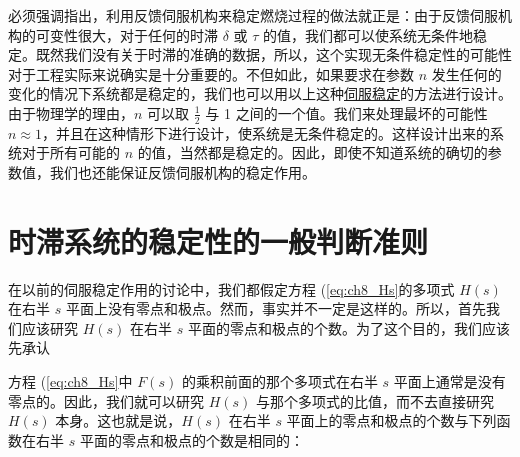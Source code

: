 必须强调指出，利用反馈伺服机构来稳定燃烧过程的做法就正是：由于反馈伺服机构的可变性很大，对于任何的时滞 $ \delta $ 或 $ \tau $ 的值，我们都可以使系统无条件地稳定。既然我们没有关于时滞的准确的数据，所以，这个实现无条件稳定性的可能性对于工程实际来说确实是十分重要的。不但如此，如果要求在参数 $ n $ 发生任何的变化的情况下系统都是稳定的，我们也可以用以上这种\underline{伺服稳定}的方法进行设计。由于物理学的理由，$ n $ 可以取 $ \frac{1}{2} $ 与 1 之间的一个值。我们来处理最坏的可能性 $ n \approx 1 $，并且在这种情形下进行设计，使系统是无条件稳定的。这样设计出来的系统对于所有可能的 $ n $ 的值，当然都是稳定的。因此，即使不知道系统的确切的参数值，我们也还能保证反馈伺服机构的稳定作用。

\section{时滞系统的稳定性的一般判断准则}

在以前的伺服稳定作用的讨论中，我们都假定方程 (\eqref{eq:ch8_Hs}的多项式 $ H(s) $ 在右半 $ s $ 平面上没有零点和极点。然而，事实并不一定是这样的。所以，首先我们应该研究 $ H(s) $ 在右半 $ s $ 平面的零点和极点的个数。为了这个目的，我们应该先承认

方程 (\eqref{eq:ch8_Hs}中 $ F(s) $ 的乘积前面的那个多项式在右半 $ s $ 平面上通常是没有零点的。因此，我们就可以研究 $ H(s) $ 与那个多项式的比值，而不去直接研究 $ H(s) $ 本身。这也就是说，$ H(s) $ 在右半 $ s $ 平面上的零点和极点的个数与下列函数在右半 $ s $ 平面的零点和极点的个数是相同的：


